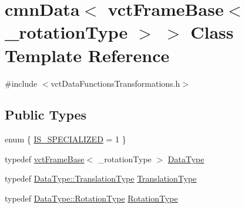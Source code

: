\hypertarget{classcmn_data_3_01vct_frame_base_3_01__rotation_type_01_4_01_4}{}\section{cmn\+Data$<$ vct\+Frame\+Base$<$ \+\_\+rotation\+Type $>$ $>$ Class Template Reference}
\label{classcmn_data_3_01vct_frame_base_3_01__rotation_type_01_4_01_4}


{\ttfamily \#include $<$vct\+Data\+Functions\+Transformations.\+h$>$}

\subsection*{Public Types}
\begin{DoxyCompactItemize}
\item 
enum \{ \hyperlink{classcmn_data_3_01vct_frame_base_3_01__rotation_type_01_4_01_4_ac5722a14087e99c91e2f4c2ef013c9e9addac037ede5fd10792d3ec714b36afb3}{I\+S\+\_\+\+S\+P\+E\+C\+I\+A\+L\+I\+Z\+E\+D} = 1
 \}
\item 
typedef \hyperlink{classvct_frame_base}{vct\+Frame\+Base}$<$ \+\_\+rotation\+Type $>$ \hyperlink{classcmn_data_3_01vct_frame_base_3_01__rotation_type_01_4_01_4_a6d3becc05b41db88283c842177d23bea}{Data\+Type}
\item 
typedef \hyperlink{classvct_frame_base_a4c397a93b65f0c38e75e99ff3a659c23}{Data\+Type\+::\+Translation\+Type} \hyperlink{classcmn_data_3_01vct_frame_base_3_01__rotation_type_01_4_01_4_a1fc56c85e3cdf6618625668e4c95950f}{Translation\+Type}
\item 
typedef \hyperlink{classvct_frame_base_a02e4eaad478400dd1d81e772caf3b01b}{Data\+Type\+::\+Rotation\+Type} \hyperlink{classcmn_data_3_01vct_frame_base_3_01__rotation_type_01_4_01_4_a8757351740a52df6d2b5be5e04ba0b0b}{Rotation\+Type}
\end{DoxyCompactItemize}
